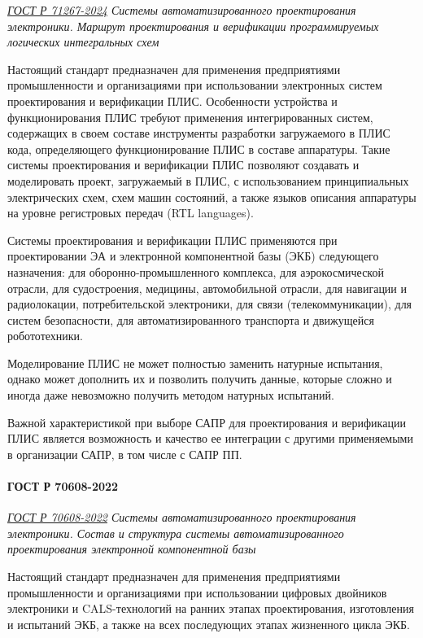 \emph{\href{https://docs.cntd.ru/document/1305118385}{ГОСТ Р 71267-2024}
Системы автоматизированного проектирования электроники.
Маршрут проектирования
и верификации программируемых логических интегральных схем
}

Настоящий стандарт предназначен для применения предприятиями промышленности
и организациями при использовании электронных систем проектирования
и верификации ПЛИС.
Особенности устройства и функционирования
ПЛИС требуют применения интегрированных систем,
содержащих в своем составе инструменты разработки загружаемого в ПЛИС кода,
определяющего функционирование ПЛИС в составе аппаратуры.
Такие системы проектирования и верификации ПЛИС позволяют создавать
и моделировать проект, загружаемый в ПЛИС,
с использованием принципиальных электрических схем, схем машин состояний,
а также языков описания аппаратуры на уровне регистровых передач (RTL languages).

Системы проектирования и верификации ПЛИС применяются при проектировании ЭА
и электронной компонентной базы (ЭКБ) следующего назначения:
для оборонно-промышленного комплекса, для аэрокосмической отрасли,
для судостроения, медицины, автомобильной отрасли,
для навигации и радиолокации, потребительской электроники,
для связи (телекоммуникации), для систем безопасности,
для автоматизированного транспорта и движущейся робототехники.

Моделирование ПЛИС не может полностью заменить натурные испытания,
однако может дополнить их и позволить получить данные,
которые сложно и иногда даже невозможно получить методом натурных испытаний.

Важной характеристикой при выборе САПР для проектирования
и верификации ПЛИС является возможность
и качество ее интеграции с другими применяемыми в организации САПР,
в том числе с САПР ПП.

\paragraph{ГОСТ Р 70608-2022}

\emph{\href{https://docs.cntd.ru/document/1200195173}{ГОСТ Р 70608-2022}
Системы автоматизированного проектирования электроники.
Состав и структура системы автоматизированного проектирования электронной компонентной базы
}

Настоящий стандарт предназначен для применения предприятиями промышленности
и организациями при использовании цифровых двойников электроники
и CALS-технологий на ранних этапах проектирования,
изготовления и испытаний ЭКБ,
а также на всех последующих этапах жизненного цикла ЭКБ.


